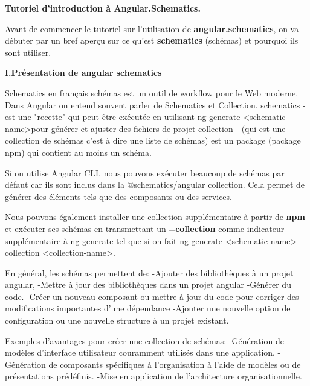 \documentclass[12pt,french]{article}
\begin{document}
		\qquad\qquad\qquad\large{\textbf{Tutoriel d’introduction à Angular.Schematics.}}\newline
	
	Avant de commencer le tutoriel sur l'utilisation de \textbf{angular.schematics}, on va débuter par un bref aperçu sur ce qu'est \textbf{schematics} (schémas) et pourquoi ils sont utiliser.\newline
	
	\textbf{I.Présentation de angular schematics}\newline
	
	Schematics en français schémas est un outil de workflow pour le Web moderne.\newline
	Dans Angular on entend souvent parler de Schematics et Collection.\smallbreak
	schematics - est une "recette" qui peut être exécutée en utilisant ng generate <schematic-name>pour générer et ajuster des fichiers de projet\smallbreak
	collection - (qui est une collection de schémas c'est à dire une liste de schémas) est un package (package npm) qui contient au moins un schéma.\newline
	
	Si on utilise Angular CLI, nous pouvons exécuter beaucoup de schémas par défaut car ils sont inclus dans la @schematics/angular collection. Cela permet de générer des éléments tels que des composants ou des services.\newline
	
	Nous pouvons également installer une collection supplémentaire à partir de \textbf{npm} et exécuter ses schémas en transmettant un \textbf{\--\--collection} comme indicateur supplémentaire à ng generate tel que si on fait ng generate <schematic-name> \--\--collection <collection-name>.\newline
	
	En général, les schémas permettent de:\smallbreak
		\quad-Ajouter des bibliothèques à un projet angular,\smallbreak
		\quad-Mettre à jour des bibliothèques dans un projet angular\smallbreak
		\quad-Générer du code.\smallbreak
		\quad-Créer un nouveau composant ou mettre à jour du code pour corriger des modifications 		importantes d'une dépendance\smallbreak
		\quad-Ajouter une nouvelle option de configuration ou une nouvelle structure à un projet existant.\newline
		
	 Exemples d'avantages pour créer une collection de schémas:\smallbreak
	\quad-Génération de modèles d'interface utilisateur couramment utilisés dans une application.\smallbreak
	\quad-Génération de composants spécifiques à l'organisation à l'aide de modèles ou de 	présentations prédéfinis.\smallbreak
	\quad-Mise en application de l'architecture organisationnelle.
\newline
\end{document}
